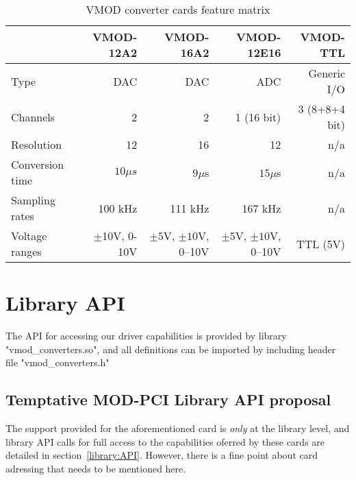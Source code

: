 \documentclass[11pt,a4paper]{article}
\begin{document}
\begin{table} \center
\begin{tabular}{lrrrr}
\hline  %
                     &VMOD-12A2           &VMOD-16A2            & VMOD-12E16	  	&  VMOD-TTL  	\\
\hline  %
  Type               & DAC                & DAC                 &  ADC 			&  Generic I/O	\\
  Channels           & 2                  &        2            &  1 (16 bit)  		&  3 (8+8+4 bit)	\\
  Resolution         &       12           &       16            &  12  			&  n/a  			\\
  Conversion time    &$10\mu s$           &   $9\mu$s           &  $15\mu$s  		&  n/a  		\\
  Sampling rates     & 100 kHz            &  111 kHz            &  167 kHz 		&  n/a 		\\
  Voltage ranges     &$\pm$10V, 0-10V     & $\pm5$V, 
					    $\pm10$V, 0--10V    & $\pm5$V, 
					    				$\pm10$V, 0--10V&  TTL (5V)  \\
\hline	%
\end{tabular}
\caption{VMOD converter cards feature matrix}
\label{table:features}
\end{table}


\section{Library API}

The API for accessing our driver capabilities is provided by library
"vmod_converters.so", and all definitions can be imported by including
header file "vmod_converters.h"

\subsection*{Temptative MOD-PCI Library API proposal}

The support provided for the aforementioned card is \emph{only}
at the library level, and library API calls for full access to the
capabilities oferred by these cards are detailed in
section~\ref{library:API}. However, there is a fine point about
card adressing that needs to be mentioned here.
\end{document}
